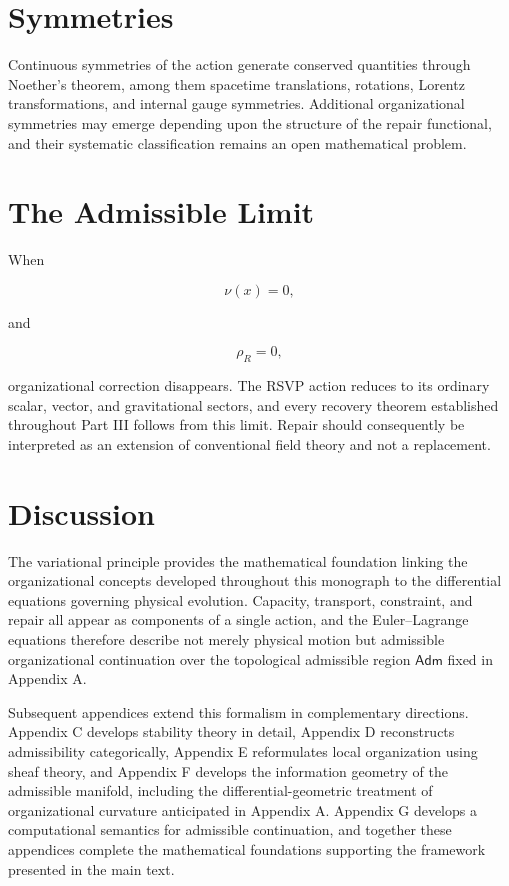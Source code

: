 \documentclass[11pt,oneside]{book}
\numberwithin{equation}{chapter}
\theoremstyle{definition}
\theoremstyle{plain}
\newcommand{\Adm}{\mathsf{Adm}}
\begin{document}
\section{Symmetries}

Continuous symmetries of the action generate conserved quantities through Noether's theorem, among them spacetime translations, rotations, Lorentz transformations, and internal gauge symmetries. Additional organizational symmetries may emerge depending upon the structure of the repair functional, and their systematic classification remains an open mathematical problem.

\section{The Admissible Limit}

When

\[
\nu(x)
=
0,
\]

and

\[
\rho_R
=
0,
\]

organizational correction disappears. The RSVP action reduces to its ordinary scalar, vector, and gravitational sectors, and every recovery theorem established throughout Part III follows from this limit. Repair should consequently be interpreted as an extension of conventional field theory and not a replacement.

\section{Discussion}

The variational principle provides the mathematical foundation linking the organizational concepts developed throughout this monograph to the differential equations governing physical evolution. Capacity, transport, constraint, and repair all appear as components of a single action, and the Euler--Lagrange equations therefore describe not merely physical motion but admissible organizational continuation over the topological admissible region \(\Adm\) fixed in Appendix A.

Subsequent appendices extend this formalism in complementary directions. Appendix C develops stability theory in detail, Appendix D reconstructs admissibility categorically, Appendix E reformulates local organization using sheaf theory, and Appendix F develops the information geometry of the admissible manifold, including the differential-geometric treatment of organizational curvature anticipated in Appendix A. Appendix G develops a computational semantics for admissible continuation, and together these appendices complete the mathematical foundations supporting the framework presented in the main text.
\end{document}
